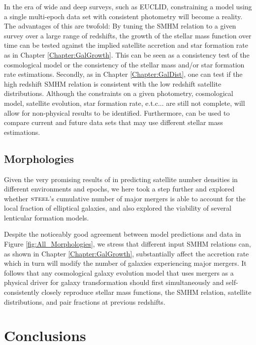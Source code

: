 In the era of wide and deep surveys, such as EUCLID, constraining a model using a single multi-epoch data set with consistent photometry will become a reality. The advantages of this are twofold: By tuning the SMHM relation to a given survey over a large range of redshifts, the growth of the stellar mass function over time can be tested against the implied satellite accretion and star formation rate as in Chapter \ref{Chapter:GalGrowth}. This can be seen as a consistency test of the cosmological model or the consistency of the stellar mass and/or star formation rate estimations. Secondly, as in Chapter \ref{Chapter:GalDist}, one can test if the high redshift SMHM relation is consistent with the low redshift satellite distributions. Although the constraints on a given photometry, cosmological model, satellite evolution, star formation rate, e.t.c... are still not complete, \steel will allow for non-physical results to be identified. Furthermore, \steel can be used to compare current and future data sets that may use different stellar mass estimations.

\subsection{Morphologies}

Given the very promising results of \steel in predicting satellite number densities in different environments and epochs, we here took a step further and explored whether $\textsc{steel}$'s cumulative number of major mergers is able to account for the local fraction of elliptical galaxies, and also explored the viability of several lenticular formation models. 

Despite the noticeably good agreement between model predictions and data in Figure \ref{fig:All_Morphologies}, we stress that different input SMHM relations can, as shown in Chapter \ref{Chapter:GalGrowth}, substantially affect the accretion rate which in turn will modify the number of galaxies experiencing major mergers. It follows that any cosmological galaxy evolution model that uses mergers as a physical driver for galaxy transformation should first simultaneously and self-consistently closely reproduce stellar mass functions, the SMHM relation, satellite distributions, and pair fractions at previous redshifts.

\section{Conclusions}
\label{sec:Conclusions}

